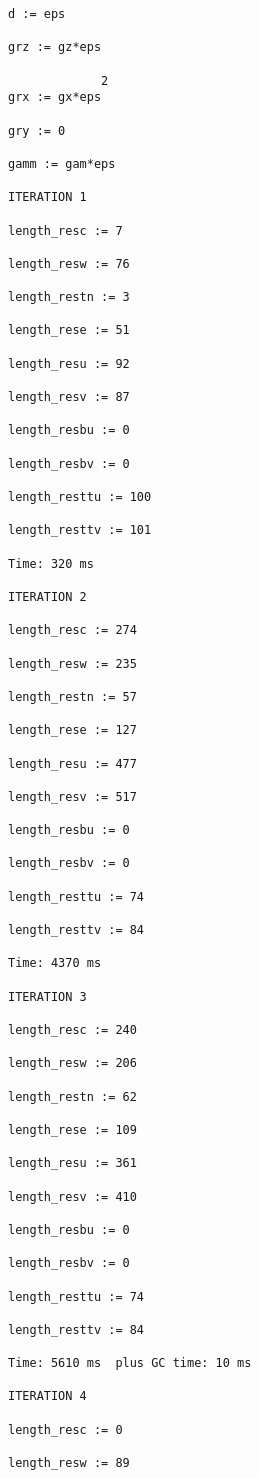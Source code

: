 \documentclass[12pt,a5paper]{article}
\begin{document}
\begin{verbatim}
d := eps

grz := gz*eps

             2
grx := gx*eps

gry := 0

gamm := gam*eps

ITERATION 1

length_resc := 7

length_resw := 76

length_restn := 3

length_rese := 51

length_resu := 92

length_resv := 87

length_resbu := 0

length_resbv := 0

length_resttu := 100

length_resttv := 101

Time: 320 ms

ITERATION 2

length_resc := 274

length_resw := 235

length_restn := 57

length_rese := 127

length_resu := 477

length_resv := 517

length_resbu := 0

length_resbv := 0

length_resttu := 74

length_resttv := 84

Time: 4370 ms

ITERATION 3

length_resc := 240

length_resw := 206

length_restn := 62

length_rese := 109

length_resu := 361

length_resv := 410

length_resbu := 0

length_resbv := 0

length_resttu := 74

length_resttv := 84

Time: 5610 ms  plus GC time: 10 ms

ITERATION 4

length_resc := 0

length_resw := 89


\end{verbatim}
\end{document}

